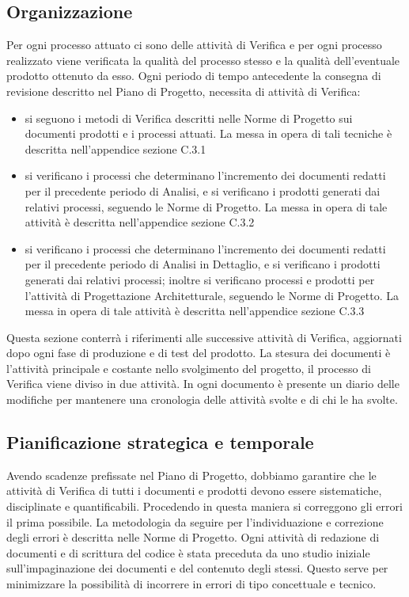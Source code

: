 \subsection{Organizzazione} %
\label{2.4}
Per ogni processo attuato ci sono delle attività di Verifica e per ogni processo realizzato viene verificata la qualità del processo stesso e la qualità dell'eventuale prodotto ottenuto da esso.
Ogni periodo di tempo antecedente la consegna di revisione descritto nel Piano di Progetto, necessita di attività di Verifica:
\begin{itemize}
\item {} si seguono i metodi di Verifica descritti nelle Norme di Progetto sui documenti prodotti e i processi attuati. La messa in opera di tali tecniche è descritta nell'appendice sezione C.3.1
\item{} si verificano i processi che determinano l'incremento dei documenti redatti per il precedente periodo di Analisi, e si verificano i prodotti generati dai relativi processi, seguendo le Norme di Progetto. La messa in opera di tale attività è descritta nell'appendice sezione C.3.2
\item{}  si verificano i processi che determinano l'incremento dei documenti redatti per il precedente periodo di Analisi in Dettaglio, e si verificano i prodotti generati dai relativi processi; inoltre si verificano processi e prodotti per l'attività di Progettazione Architetturale, seguendo le Norme di Progetto. La messa in opera di tale attività è descritta nell'appendice sezione C.3.3
\end{itemize}
Questa sezione conterrà i riferimenti alle successive attività di Verifica, aggiornati dopo ogni fase di produzione e di test del prodotto.
La stesura dei documenti è l'attività principale e costante nello svolgimento del progetto, il processo di Verifica viene diviso in due attività.
In ogni documento è presente un diario delle modifiche per mantenere una cronologia delle attività svolte e di chi le ha svolte.

\subsection{Pianificazione strategica e temporale} %
\label{2.5}
Avendo scadenze prefissate nel Piano di Progetto, dobbiamo garantire che le attività di Verifica di tutti i documenti e prodotti devono essere sistematiche, disciplinate e quantificabili. Procedendo in questa maniera si correggono gli errori il prima possibile.
La metodologia da seguire per l'individuazione e correzione degli errori è descritta nelle Norme di Progetto.
Ogni attività di redazione di documenti e di scrittura del codice è stata preceduta da uno studio iniziale sull'impaginazione dei documenti e del contenuto degli stessi. Questo serve per minimizzare la possibilità di incorrere in errori di tipo concettuale e tecnico.

